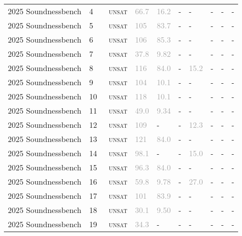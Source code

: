 \begin{center}
{\begin{longtable}{@{}llllllllll@{}}
2025 Soundnessbench & 4 & ~\textsc{unsat} & \textcolor{darkgray}{66.7} & \textcolor{darkgray}{16.2} & - & - & - & - & - \\
2025 Soundnessbench & 5 & ~\textsc{unsat} & \textcolor{darkgray}{105} & \textcolor{darkgray}{83.7} & - & - & - & - & - \\
2025 Soundnessbench & 6 & ~\textsc{unsat} & \textcolor{darkgray}{106} & \textcolor{darkgray}{85.3} & - & - & - & - & - \\
2025 Soundnessbench & 7 & ~\textsc{unsat} & \textcolor{darkgray}{37.8} & \textcolor{darkgray}{9.82} & - & - & - & - & - \\
2025 Soundnessbench & 8 & ~\textsc{unsat} & \textcolor{darkgray}{116} & \textcolor{darkgray}{84.0} & - & \textcolor{darkgray}{15.2} & - & - & - \\
2025 Soundnessbench & 9 & ~\textsc{unsat} & \textcolor{darkgray}{104} & \textcolor{darkgray}{10.1} & - & - & - & - & - \\
2025 Soundnessbench & 10 & ~\textsc{unsat} & \textcolor{darkgray}{118} & \textcolor{darkgray}{10.1} & - & - & - & - & - \\
2025 Soundnessbench & 11 & ~\textsc{unsat} & \textcolor{darkgray}{49.0} & \textcolor{darkgray}{9.34} & - & - & - & - & - \\
2025 Soundnessbench & 12 & ~\textsc{unsat} & \textcolor{darkgray}{109} & - & - & \textcolor{darkgray}{12.3} & - & - & - \\
2025 Soundnessbench & 13 & ~\textsc{unsat} & \textcolor{darkgray}{121} & \textcolor{darkgray}{84.0} & - & - & - & - & - \\
2025 Soundnessbench & 14 & ~\textsc{unsat} & \textcolor{darkgray}{98.1} & - & - & \textcolor{darkgray}{15.0} & - & - & - \\
2025 Soundnessbench & 15 & ~\textsc{unsat} & \textcolor{darkgray}{96.3} & \textcolor{darkgray}{84.0} & - & - & - & - & - \\
2025 Soundnessbench & 16 & ~\textsc{unsat} & \textcolor{darkgray}{59.8} & \textcolor{darkgray}{9.78} & - & \textcolor{darkgray}{27.0} & - & - & - \\
2025 Soundnessbench & 17 & ~\textsc{unsat} & \textcolor{darkgray}{101} & \textcolor{darkgray}{83.9} & - & - & - & - & - \\
2025 Soundnessbench & 18 & ~\textsc{unsat} & \textcolor{darkgray}{30.1} & \textcolor{darkgray}{9.50} & - & - & - & - & - \\
2025 Soundnessbench & 19 & ~\textsc{unsat} & \textcolor{darkgray}{34.3} & - & - & - & - & - & - \\

\end{longtable}}
\end{center}
